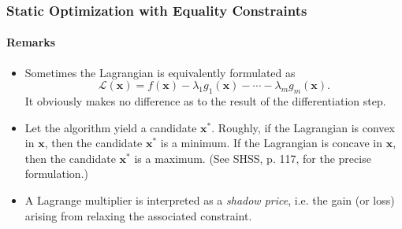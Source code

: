 \documentclass[10pt]{beamer}
\theoremstyle{definition}
\begin{document}
\begin{frame}[fragile]
\frametitle{Static Optimization with Equality Constraints}
\framesubtitle{Remarks}
\begin{itemize}
\item Sometimes the Lagrangian is equivalently formulated as \[ \mathcal{L}(\mathbf{x}) = f(\mathbf{x}) - \lambda_1 g_1(\mathbf{x}) - \cdots - \lambda_m g_m(\mathbf{x}). \] It obviously makes no difference as to the result of the differentiation step.
\item Let the algorithm yield a candidate $ \mathbf{x^*} $. Roughly, if the Lagrangian is convex in $ \mathbf{x} $, then the candidate $ \mathbf{x^*} $ is a minimum. If the Lagrangian is concave in $ \mathbf{x} $, then the candidate $ \mathbf{x^*} $ is a maximum. (See SHSS, p. 117, for the precise formulation.)
\item A Lagrange multiplier is interpreted as a \emph{shadow price}, i.e. the gain (or loss) arising from relaxing the associated constraint.
\end{itemize}


\end{frame}
\end{document}
